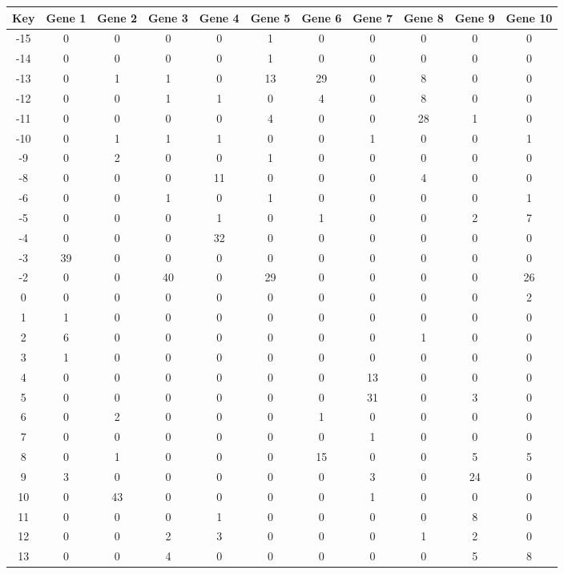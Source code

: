 \begin{tabular}{|c|c|c|c|c|c|c|c|c|c|c|}
\hline
Key & Gene 1 & Gene 2 & Gene 3 & Gene 4 & Gene 5 & Gene 6 & Gene 7 & Gene 8 & Gene 9 & Gene 10 \\
\hline
-15 & 0 & 0 & 0 & 0 & 1 & 0 & 0 & 0 & 0 & 0 \\
-14 & 0 & 0 & 0 & 0 & 1 & 0 & 0 & 0 & 0 & 0 \\
-13 & 0 & 1 & 1 & 0 & 13 & 29 & 0 & 8 & 0 & 0 \\
-12 & 0 & 0 & 1 & 1 & 0 & 4 & 0 & 8 & 0 & 0 \\
-11 & 0 & 0 & 0 & 0 & 4 & 0 & 0 & 28 & 1 & 0 \\
-10 & 0 & 1 & 1 & 1 & 0 & 0 & 1 & 0 & 0 & 1 \\
-9 & 0 & 2 & 0 & 0 & 1 & 0 & 0 & 0 & 0 & 0 \\
-8 & 0 & 0 & 0 & 11 & 0 & 0 & 0 & 4 & 0 & 0 \\
-6 & 0 & 0 & 1 & 0 & 1 & 0 & 0 & 0 & 0 & 1 \\
-5 & 0 & 0 & 0 & 1 & 0 & 1 & 0 & 0 & 2 & 7 \\
-4 & 0 & 0 & 0 & 32 & 0 & 0 & 0 & 0 & 0 & 0 \\
-3 & 39 & 0 & 0 & 0 & 0 & 0 & 0 & 0 & 0 & 0 \\
-2 & 0 & 0 & 40 & 0 & 29 & 0 & 0 & 0 & 0 & 26 \\
0 & 0 & 0 & 0 & 0 & 0 & 0 & 0 & 0 & 0 & 2 \\
1 & 1 & 0 & 0 & 0 & 0 & 0 & 0 & 0 & 0 & 0 \\
2 & 6 & 0 & 0 & 0 & 0 & 0 & 0 & 1 & 0 & 0 \\
3 & 1 & 0 & 0 & 0 & 0 & 0 & 0 & 0 & 0 & 0 \\
4 & 0 & 0 & 0 & 0 & 0 & 0 & 13 & 0 & 0 & 0 \\
5 & 0 & 0 & 0 & 0 & 0 & 0 & 31 & 0 & 3 & 0 \\
6 & 0 & 2 & 0 & 0 & 0 & 1 & 0 & 0 & 0 & 0 \\
7 & 0 & 0 & 0 & 0 & 0 & 0 & 1 & 0 & 0 & 0 \\
8 & 0 & 1 & 0 & 0 & 0 & 15 & 0 & 0 & 5 & 5 \\
9 & 3 & 0 & 0 & 0 & 0 & 0 & 3 & 0 & 24 & 0 \\
10 & 0 & 43 & 0 & 0 & 0 & 0 & 1 & 0 & 0 & 0 \\
11 & 0 & 0 & 0 & 1 & 0 & 0 & 0 & 0 & 8 & 0 \\
12 & 0 & 0 & 2 & 3 & 0 & 0 & 0 & 1 & 2 & 0 \\
13 & 0 & 0 & 4 & 0 & 0 & 0 & 0 & 0 & 5 & 8 \\
\hline
\end{tabular}